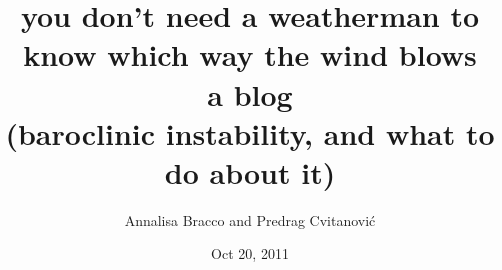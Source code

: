 
        \title{
\huge
you don't need a weatherman
to know which way the wind blows
\\ [4ex]
\Huge
a blog
\\
{\LARGE(baroclinic instability, and what to do about it)}
        \\\vspace{1.0cm}
        }\author{
{Annalisa Bracco}
and
Predrag Cvitanovi\'{c}
    }
        \date{Oct 20, 2011} \Private{\date{\today}}
